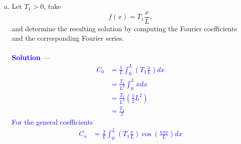 \documentclass[12pt]{article}
\begin{document}
\begin{enumerate}[(a)]
{\textbf{For $\lambda < 0$}: \\ \\
$$c_1 = c_2 = 0 \implies X(x) = 0 \implies u(t,x) = 0$$
\textbf{For $\lambda = 0$}: \\ \\
$$c_5 = 0 \implies X(x) = c_4 \implies u(t,x) = c_3 c_4 = C_0 \;\;\; \text{for some $C_0 \in \mathbb{R}$}$$ \\ \\
\textbf{For $\lambda > 0$}: \\ \\
$$c_8 = 0 \implies u_n(t,x) = C_n e^{- k \left( \frac{n\pi}{L} \right)^2 t} \cos \left( \frac{n\pi x}{L} \right) \;\;\; \text{for $C_n \in \mathbb{R}$}$$ \\
Note that each separated eigenfunction solution will have its own constant $C_n$. Hence the general solution is the superposition of all solutions from each of these 3 cases:
$$\boxed{u(t,x) = C_0 + \sum_{n=1}^{\infty} C_n e^{- k \left( \frac{n\pi}{L} \right)^2 t} \cos \left( \frac{n\pi x}{L} \right)}$$ \\ \\
Let us now apply the initial condition $u(0,x) = f(x)$ for $0 \leq x \leq L$.
$$\implies C_0 + \sum_{n=1}^{\infty} C_n \cos \left( \frac{n\pi x}{L} \right) = f(x)$$
Notice that the application of this initial condition creates an equation that is exactly the Fourier series expression of $f(x)$. For both sides to be equal, we must have that each $C_n$ is exactly the $n$th Fourier coefficient in the expansion of $f(x)$ on $[0,L]$. Hence $$\boxed{C_0 = \frac{1}{L} \int_{0}^L f(x) dx}$$
$$\boxed{C_n = \frac{2}{L} \int_{0}^L f(x) \cos \left( \frac{n \pi x}{L} \right) dx \;\;\;\;\; n \geq 1}$$
}
\item Let $T_1 > 0$, take
$$f(x) = T_1 \frac{x}{L},$$
and determine the resulting solution by computing the Fourier coefficients and the corresponding Fourier series. \\ \\ \textcolor{blue}{\textbf{Solution} — 
\begin{align*}
C_0 &= \frac{1}{L} \int_0^L \left( T_1 \frac{x}{L} \right) dx \\
&= \frac{T_1}{L^2} \int_0^L x dx \\
&= \frac{T_1}{L^2} \left( \frac{1}{2} L^2 \right) \\
&= \frac{T_1}{2}
\end{align*}
For the general coefficients
\begin{align*}
C_n &= \frac{2}{L} \int_0^L \left( T_1 \frac{x}{L} \right) \cos \left( \frac{n\pi x}{L} \right) dx \\

\end{align*}}
\end{enumerate}
\end{document}
